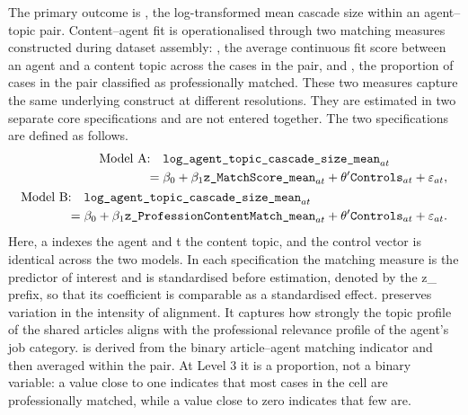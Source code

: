The primary outcome is , the log-transformed mean cascade size within an agent–topic pair. Content–agent fit is operationalised through two matching measures constructed during dataset assembly: , the average continuous fit score between an agent and a content topic across the cases in the pair, and , the proportion of cases in the pair classified as professionally matched. These two measures capture the same underlying construct at different resolutions. They are estimated in two separate core specifications and are not entered together. The two specifications are defined as follows.
{\setlength{\abovedisplayskip}{0pt}
\setlength{\belowdisplayskip}{0.35\baselineskip}
\setlength{\abovedisplayshortskip}{0pt}
\setlength{\belowdisplayshortskip}{0.35\baselineskip}
\begin{align}
\begin{split}
\text{Model A:}\quad
&\varname{log\_agent\_topic\_cascade\_size\_mean}_{at} \\
={}& \beta_{0}
+ \beta_{1}\varname{z\_MatchScore\_mean}_{at}
+ \theta' \varname{Controls}_{at}
+ \varepsilon_{at},
\end{split} \\
\begin{split}
\text{Model B:}\quad
&\varname{log\_agent\_topic\_cascade\_size\_mean}_{at} \\
={}& \beta_{0}
+ \beta_{1}\varname{z\_ProfessionContentMatch\_mean}_{at}
+ \theta' \varname{Controls}_{at}
+ \varepsilon_{at}.
\end{split}
\end{align}
}
Here, a indexes the agent and t the content topic, and the control vector  is identical across the two models. In each specification the matching measure is the predictor of interest and is standardised before estimation, denoted by the z\_ prefix, so that its coefficient is comparable as a standardised effect.  preserves variation in the intensity of alignment. It captures how strongly the topic profile of the shared articles aligns with the professional relevance profile of the agent's job category.  is derived from the binary article–agent matching indicator and then averaged within the pair. At Level 3 it is a proportion, not a binary variable: a value close to one indicates that most cases in the cell are professionally matched, while a value close to zero indicates that few are.

